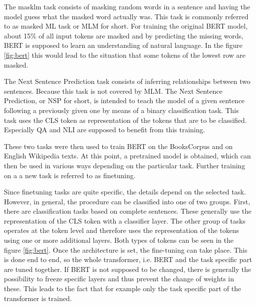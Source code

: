 The masklm task consists of masking random words in a sentence and having the model guess what the masked word actually was. This task is commonly referred to as masked ML task or MLM for short. For training the original BERT model, about 15\% of all input tokens are masked and by predicting the missing words, BERT is supposed to learn an understanding of natural language. In the figure \ref{fig:bert} this would lead to the situation that some tokens of the lowest row are masked. \cite{Devlin2018}

The Next Sentence Prediction task consists of inferring relationships between two sentences. Because this task is not covered by MLM. The Next Sentence Prediction, or NSP for short, is intended to teach the model of a given sentence following a previously given one by means of a binary classification task. This task uses the CLS token as representation of the tokens that are to be classified. Especially QA and NLI are supposed to benefit from this training. \cite{Devlin2018}

These two tasks were then used to train BERT on the BooksCorpus and on English Wikipedia texts. At this point, a pretrained model is obtained, which can then be used in various ways depending on the particular task. Further training on a a new task is referred to as finetuning. \cite{Devlin2018}

Since finetuning tasks are quite specific, the details depend on the selected task. However, in general, the procedure can be classified into one of two groups. First, there are classification tasks based on complete sentences. These generally use the representation of the CLS token with a classifier layer. The other group of tasks operates at the token level and therefore uses the representation of the tokens using one or more additional layers. Both types of tokens can be seen in the figure \ref{fig:bert}.  Once the architecture is set, the fine-tuning can take place. This is done end to end, so the whole transformer, i.e. BERT and the task specific part are tuned together. If BERT is not supposed to be changed, there is generally the possibility to freeze specific layers and thus prevent the change of weights in these. This leads to the fact that for example only the task specific part of the transformer is trained. 


